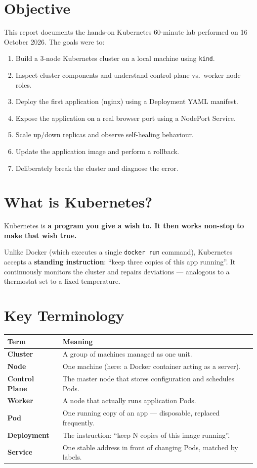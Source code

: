 \documentclass[12pt,a4paper]{report}
\begin{document}
\section*{Objective}
This report documents the hands-on Kubernetes 60-minute lab performed on 16 October 2026.
The goals were to:
\begin{enumerate}[leftmargin=2em]
  \item Build a 3-node Kubernetes cluster on a local machine using \texttt{kind}.
  \item Inspect cluster components and understand control-plane vs.\ worker node roles.
  \item Deploy the first application (nginx) using a Deployment YAML manifest.
  \item Expose the application on a real browser port using a NodePort Service.
  \item Scale up/down replicas and observe self-healing behaviour.
  \item Update the application image and perform a rollback.
  \item Deliberately break the cluster and diagnose the error.
\end{enumerate}

\section*{What is Kubernetes?}
Kubernetes is \textbf{a program you give a wish to. It then works non-stop to make that wish true.}

Unlike Docker (which executes a single \texttt{docker run} command), Kubernetes accepts a
\textbf{standing instruction}: ``keep three copies of this app running''. It continuously monitors
the cluster and repairs deviations --- analogous to a thermostat set to a fixed temperature.

\section*{Key Terminology}
\begin{center}
\begin{tabular}{>{\bfseries}lp{9.5cm}}
\toprule
Term & Meaning \\
\midrule
Cluster       & A group of machines managed as one unit. \\
Node          & One machine (here: a Docker container acting as a server). \\
Control Plane & The master node that stores configuration and schedules Pods. \\
Worker        & A node that actually runs application Pods. \\
Pod           & One running copy of an app --- disposable, replaced frequently. \\
Deployment    & The instruction: ``keep N copies of this image running''. \\
Service       & One stable address in front of changing Pods, matched by labels. \\
\bottomrule
\end{tabular}
\end{center}
\end{document}
